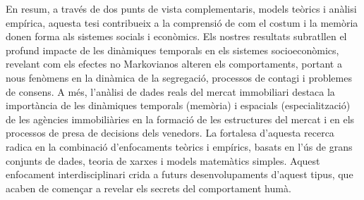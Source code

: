 En resum, a través de dos punts de vista complementaris, models teòrics i anàlisi empírica, aquesta tesi contribueix a la comprensió de com el costum i la memòria donen forma als sistemes socials i econòmics. Els nostres resultats subratllen el profund impacte de les dinàmiques temporals en els sistemes socioeconòmics, revelant com els efectes no Markovianos alteren els comportaments, portant a nous fenòmens en la dinàmica de la segregació, processos de contagi i problemes de consens. A més, l'anàlisi de dades reals del mercat immobiliari destaca la importància de les dinàmiques temporals (memòria) i espacials (especialització) de les agències immobiliàries en la formació de les estructures del mercat i en els processos de presa de decisions dels venedors. La fortalesa d'aquesta recerca radica en la combinació d'enfocaments teòrics i empírics, basats en l'ús de grans conjunts de dades, teoria de xarxes i models matemàtics simples. Aquest enfocament interdisciplinari crida a futurs desenvolupaments d'aquest tipus, que acaben de començar a revelar els secrets del comportament humà.

\vfill